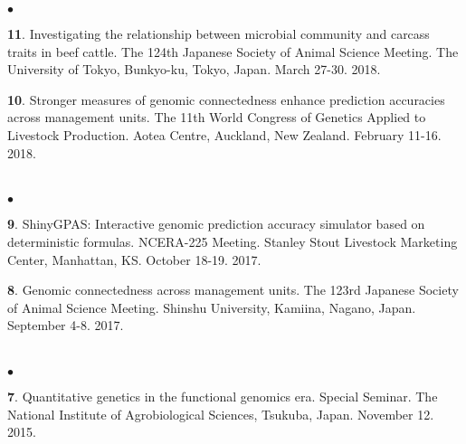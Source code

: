 \documentclass[margin,line,10pt]{res}
\newenvironment{list2}{
  \begin{list}{$\bullet$}{%
      \setlength{\itemsep}{0in}
      \setlength{\parsep}{0in} \setlength{\parskip}{0in}
      \setlength{\topsep}{0in} \setlength{\partopsep}{0in} 
      \setlength{\leftmargin}{0.2in}}}{\end{list}}
\begin{document}
\begin{resume}
\begin{list2}
  \vspace{0.5cm}

  
  \item [{\bf 11}.] Investigating the relationship between microbial community and carcass traits in beef cattle.  The 124th Japanese Society of Animal Science Meeting. The University of Tokyo, Bunkyo-ku, Tokyo, Japan. March 27-30. 2018.

    
    \vspace{0.5cm}

          
\item [{\bf 10}.] Stronger measures of genomic connectedness enhance prediction accuracies across management units. The 11th World Congress of Genetics Applied to Livestock Production.  Aotea Centre, Auckland, New Zealand. February 11-16. 2018.

\end{list2}  





\section{}
\begin{list2}

  \item [{\bf 9}.] ShinyGPAS: Interactive genomic prediction accuracy simulator based on deterministic formulas. NCERA-225 Meeting. Stanley Stout Livestock Marketing Center, Manhattan, KS. October 18-19. 2017.

      \vspace{0.5cm}

  \item [{\bf 8}.] Genomic connectedness across management units. The 123rd Japanese Society of Animal Science Meeting. Shinshu University, Kamiina, Nagano, Japan. September 4-8. 2017.

\end{list2}  

    
\section{}
\begin{list2}

  \item [{\bf 7}.] Quantitative genetics in the functional genomics era. Special Seminar. The National Institute of Agrobiological Sciences, Tsukuba, Japan. November 12. 2015.


\end{list2}
\end{resume}
\end{document}
